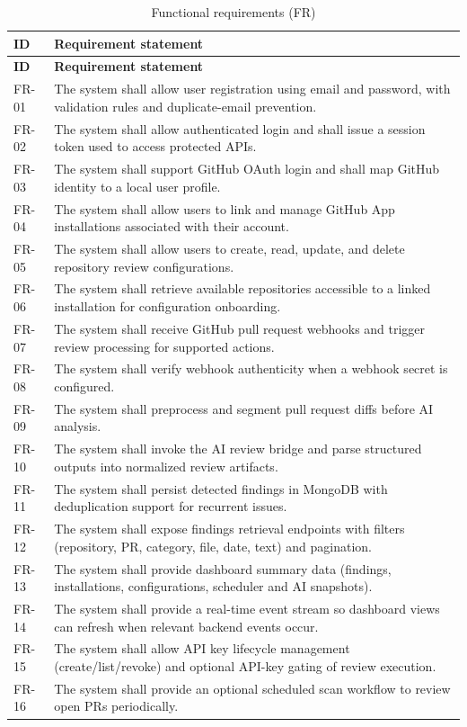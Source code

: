 \begin{longtable}{p{}p{}}
\caption{Functional requirements (FR)}\label{tab:functional_requirements}\\
\toprule
\textbf{ID} & \textbf{Requirement statement} \\
\midrule
\endfirsthead
\toprule
\textbf{ID} & \textbf{Requirement statement} \\
\midrule
\endhead
\bottomrule
\endfoot
FR-01 & The system shall allow user registration using email and password, with validation rules and duplicate-email prevention. \\
FR-02 & The system shall allow authenticated login and shall issue a session token used to access protected APIs. \\
FR-03 & The system shall support GitHub OAuth login and shall map GitHub identity to a local user profile. \\
FR-04 & The system shall allow users to link and manage GitHub App installations associated with their account. \\
FR-05 & The system shall allow users to create, read, update, and delete repository review configurations. \\
FR-06 & The system shall retrieve available repositories accessible to a linked installation for configuration onboarding. \\
FR-07 & The system shall receive GitHub pull request webhooks and trigger review processing for supported actions. \\
FR-08 & The system shall verify webhook authenticity when a webhook secret is configured. \\
FR-09 & The system shall preprocess and segment pull request diffs before AI analysis. \\
FR-10 & The system shall invoke the AI review bridge and parse structured outputs into normalized review artifacts. \\
FR-11 & The system shall persist detected findings in MongoDB with deduplication support for recurrent issues. \\
FR-12 & The system shall expose findings retrieval endpoints with filters (repository, PR, category, file, date, text) and pagination. \\
FR-13 & The system shall provide dashboard summary data (findings, installations, configurations, scheduler and AI snapshots). \\
FR-14 & The system shall provide a real-time event stream so dashboard views can refresh when relevant backend events occur. \\
FR-15 & The system shall allow API key lifecycle management (create/list/revoke) and optional API-key gating of review execution. \\
FR-16 & The system shall provide an optional scheduled scan workflow to review open PRs periodically. \\
\end{longtable}

